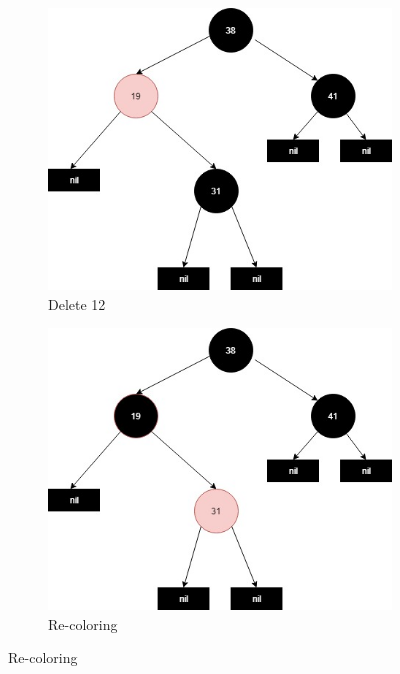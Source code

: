 \documentclass[20pt]{article} %
\begin{document}
\begin{figure}[!htbp]
  	\centering
   	\begin{subfigure}[p]{0.4\linewidth}
    	\includegraphics[width=\linewidth]{a3-1.jpg}
     	\caption{Delete 12}
   	\end{subfigure}
  	\begin{subfigure}[p]{0.4\linewidth}
    	\includegraphics[width=\linewidth]{a3-2.jpg}
    	\caption{Re-coloring}
  	\end{subfigure}


\end{figure}
\end{document}
